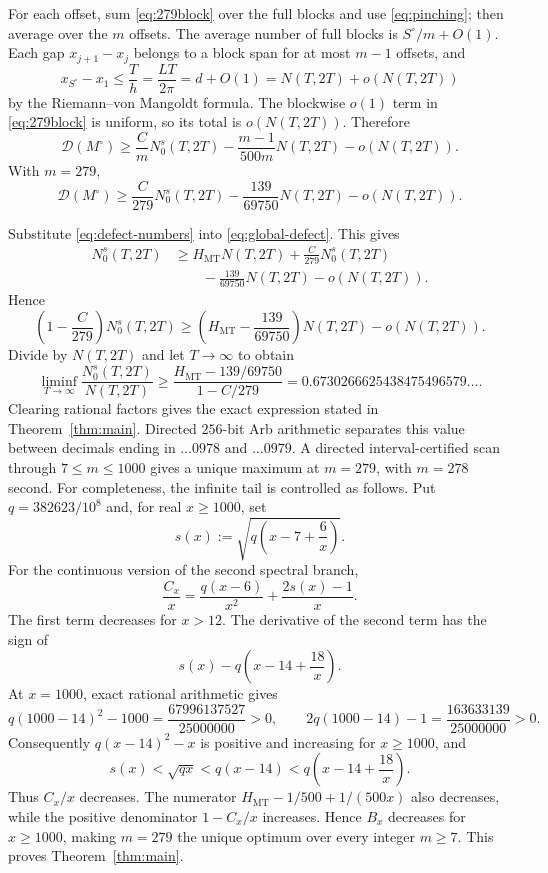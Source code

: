 \documentclass[11pt]{article}
\newcommand{\cD}{\mathcal D}
\begin{document}
For each offset, sum \eqref{eq:279block} over the full blocks and use
\eqref{eq:pinching}; then average over the $m$ offsets.  The average number of
full blocks is $S^\circ/m+O(1)$.  Each gap $x_{j+1}-x_j$ belongs to a block
span for at most $m-1$ offsets, and
\[
 x_{S^\circ}-x_1
 \le\frac{T}{h}
 =\frac{LT}{2\pi}
 =d+O(1)
 =N(T,2T)+o(N(T,2T))
\]
by the Riemann--von Mangoldt formula.  The blockwise $o(1)$ term in
\eqref{eq:279block} is uniform, so its total is $o(N(T,2T))$.  Therefore
\begin{equation}\label{eq:defect-global}
 \cD(M^\circ)
 \ge \frac{C}{m}N_0^s(T,2T)
 -\frac{m-1}{500m}N(T,2T)-o(N(T,2T)).
\end{equation}
With $m=279$,
\begin{equation}\label{eq:defect-numbers}
 \cD(M^\circ)
 \ge
 \frac{C}{279}N_0^s(T,2T)
 -\frac{139}{69750}N(T,2T)-o(N(T,2T)).
\end{equation}

Substitute \eqref{eq:defect-numbers} into \eqref{eq:global-defect}.  This gives
\begin{align*}
 N_0^s(T,2T)
 &\ge H_{\mathrm{MT}}N(T,2T)
 +\frac{C}{279}N_0^s(T,2T)\\
 &\qquad-\frac{139}{69750}N(T,2T)-o(N(T,2T)).
\end{align*}
Hence
\[
 \left(1-\frac{C}{279}\right)N_0^s(T,2T)
 \ge
 \left(H_{\mathrm{MT}}-\frac{139}{69750}\right)N(T,2T)
 -o(N(T,2T)).
\]
Divide by $N(T,2T)$ and let $T\to\infty$ to obtain
\[
 \liminf_{T\to\infty}\frac{N_0^s(T,2T)}{N(T,2T)}
 \ge
 \frac{H_{\mathrm{MT}}-139/69750}{1-C/279}
 =0.6730266625438475496579\ldots .
\]
Clearing rational factors gives the exact expression stated in
Theorem~\ref{thm:main}.  Directed $256$-bit Arb arithmetic separates this
value between decimals ending in $\ldots0978$ and $\ldots0979$.  A directed
interval-certified scan through $7\le m\le1000$ gives a unique maximum at
$m=279$, with
$m=278$ second.  For completeness, the infinite tail is controlled as
follows.  Put $q=382623/10^8$ and, for real $x\ge1000$, set
\[
 s(x):=\sqrt{q\left(x-7+\frac6x\right)}.
\]
For the continuous version of the second spectral branch,
\[
 \frac{C_x}{x}
 =\frac{q(x-6)}{x^2}+\frac{2s(x)-1}{x}.
\]
The first term decreases for $x>12$.  The derivative of the second term has
the sign of
\[
 s(x)-q\left(x-14+\frac{18}{x}\right).
\]
At $x=1000$, exact rational arithmetic gives
\[
 q(1000-14)^2-1000=\frac{67996137527}{25000000}>0,
 \qquad
 2q(1000-14)-1=\frac{163633139}{25000000}>0.
\]
Consequently $q(x-14)^2-x$ is positive and increasing for $x\ge1000$, and
\[
 s(x)<\sqrt{qx}<q(x-14)
 <q\left(x-14+\frac{18}{x}\right).
\]
Thus $C_x/x$ decreases.  The numerator
$H_{\mathrm{MT}}-1/500+1/(500x)$ also decreases, while the positive
denominator $1-C_x/x$ increases.  Hence $B_x$ decreases for $x\ge1000$,
making $m=279$ the unique optimum over every integer $m\ge7$.
This proves Theorem~\ref{thm:main}.
\end{document}
